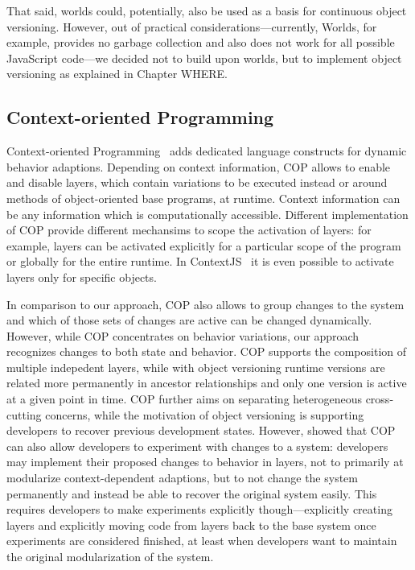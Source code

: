 That said, worlds could, potentially, also be used as a basis for continuous object versioning.
However, out of practical considerations---currently, Worlds, for example, provides no garbage collection and also does not work for all possible JavaScript code---we decided not to build upon worlds, but to implement object versioning as explained in Chapter WHERE. 


\subsection{Context-oriented Programming}

Context-oriented Programming~\cite{Hirschfeld2008COP} adds dedicated language constructs for dynamic behavior adaptions.
Depending on context information, COP allows to enable and disable layers, which contain variations to be executed instead or around methods of object-oriented base programs, at runtime.
Context information can be any information which is computationally accessible.
Different implementation of COP provide different mechansims to scope the activation of layers: for example, layers can be activated explicitly for a particular scope of the program or globally for the entire runtime.
In ContextJS~\cite{Lincke2011OIC} it is even possible to activate layers only for specific objects.

In comparison to our approach, COP also allows to group changes to the system and which of those sets of changes are active can be changed dynamically.
However, while COP concentrates on behavior variations, our approach recognizes changes to both state and behavior.
COP supports the composition of multiple indepedent layers, while with object versioning runtime versions are related more permanently in ancestor relationships and only one version is active at a given point in time.
COP further aims on separating heterogeneous cross-cutting concerns, while the motivation of object versioning is supporting developers to recover previous development states.
However, \cite{Lincke2012SCS} showed that COP can also allow developers to experiment with changes to a system: developers may implement their proposed changes to behavior in layers, not to primarily at modularize context-dependent adaptions, but to not change the system permanently and instead be able to recover the original system easily.
This requires developers to make experiments explicitly though---explicitly creating layers and explicitly moving code from layers back to the base system once experiments are considered finished, at least when developers want to maintain the original modularization of the system.


